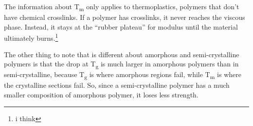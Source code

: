\documentclass[12pt]{article}[titlepage]
\newcommand{\say}[1]{``#1''}
\newcommand{\1}{\={a}}
\newcommand{\2}{\={e}}
\newcommand{\3}{\={\i}}
\newcommand{\4}{\=o}
\newcommand{\5}{\=u}
\newcommand{\6}{\={A}}
\newcommand{\sub}[1]{\textsubscript{#1}}
\renewcommand{\,}{\textsuperscript{,}}
\begin{document}
The information about T\sub{m} only applies to thermoplastics, polymers that don't have chemical crosslinks.
If a polymer has crosslinks, it never reaches the viscous phase.
Instead, it stays at the \say{rubber plateau} for modulus until the material ultimately burns.\footnote{i think}

The other thing to note that is different about amorphous and semi-crystalline polymers is that the drop at T\sub{g} is much larger in amorphous polymers than in semi-crystalline, because T\sub{g} is where amorphous regions fail, while T\sub{m} is where the crystalline sections fail.
So, since a semi-crystalline polymer has a much smaller composition of amorphous polymer, it loses less strength.
\end{document}
